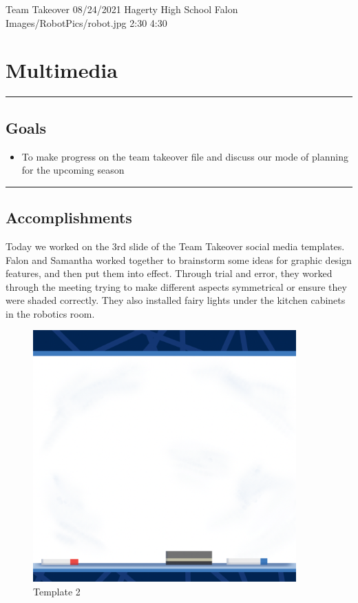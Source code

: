 \insertmeeting 
	{Team Takeover} 
	{08/24/2021}
	{Hagerty High School}
	{Falon}
	{Images/RobotPics/robot.jpg}
	{2:30}
 	{4:30}
	
\section*{Multimedia}
\noindent\hfil\rule{\textwidth}{.4pt}\hfil
\subsection*{Goals}
\begin{itemize}
    \item To make progress on the team takeover file and discuss our mode of planning for the upcoming season
  

\end{itemize} 

\noindent\hfil\rule{\textwidth}{.4pt}\hfil

\subsection*{Accomplishments}
Today we worked on the 3rd slide of the Team Takeover social media templates. Falon and Samantha worked together to brainstorm some ideas for graphic design features, and then put them into effect. Through trial and error, they worked through the meeting trying to make different aspects symmetrical or ensure they were shaded correctly. They also installed fairy lights under the kitchen cabinets in the robotics room.

\begin{figure}[htp]
\centering
\includegraphics[width=0.9\textwidth, angle=0]{Meetings/August/08-24-21/1.PNG}
\caption{Template 2}
\label{fig:pic1}
\end{figure}

